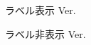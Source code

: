 \documentclass{ltjsarticle}
\begin{document}
\begin{figure}[H]
  \caption{ラベル表示 Ver.}
\end{figure}
\begin{figure}[H]
  \caption{ラベル非表示 Ver.}
\end{figure}
\end{document}
